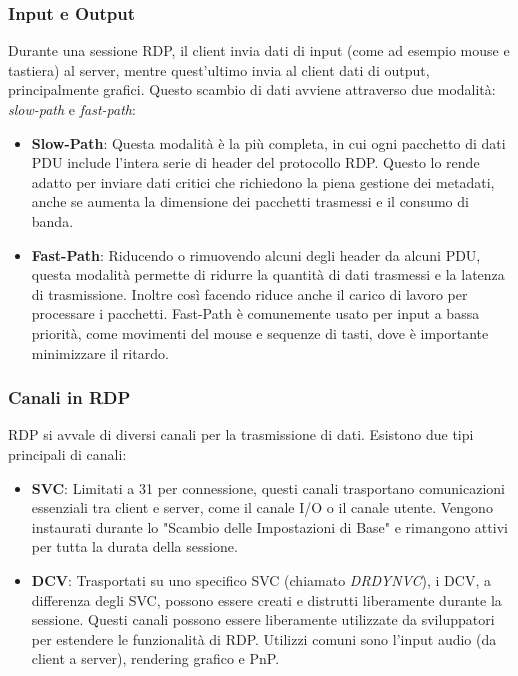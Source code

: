 \documentclass[12pt,a4paper,openright,twoside]{book}
\begin{document}
\subsubsection{Input e Output}
Durante una sessione \ac{RDP}, il client invia dati di input (come ad esempio mouse e tastiera) al server, mentre quest'ultimo invia al client dati di output, principalmente grafici.
Questo scambio di dati avviene attraverso due modalità: \textit{slow-path} e \textit{fast-path}:
\begin{itemize}
    \item \textbf{Slow-Path}: Questa modalità è la più completa, in cui ogni pacchetto di dati \ac{PDU} include l'intera serie di header del protocollo \ac{RDP}.
    Questo lo rende adatto per inviare dati critici che richiedono la piena gestione dei metadati, anche se aumenta la dimensione dei pacchetti trasmessi e il consumo di banda.
    \item \textbf{Fast-Path}: Riducendo o rimuovendo alcuni degli header da alcuni \ac{PDU},
    questa modalità permette di ridurre la quantità di dati trasmessi e la latenza di trasmissione.
    Inoltre così facendo riduce anche il carico di lavoro per processare i pacchetti.
    Fast-Path è comunemente usato per input a bassa priorità, come movimenti del mouse e sequenze di tasti, dove è importante minimizzare il ritardo.
\end{itemize}

\subsubsection{Canali in RDP}
\ac{RDP} si avvale di diversi canali per la trasmissione di dati. Esistono due tipi principali di canali:
\begin{itemize}
    \item \textbf{\ac{SVC}}: Limitati a 31 per connessione,
    questi canali trasportano comunicazioni essenziali tra client e server, come il canale I/O o il canale utente. Vengono instaurati durante lo "Scambio delle Impostazioni di Base" e rimangono attivi per tutta la durata della sessione.
    \item \textbf{\ac{DCV}}: Trasportati su uno specifico \ac{SVC} (chiamato \emph{DRDYNVC}),
    i \ac{DCV}, a differenza degli \ac{SVC},
    possono essere creati e distrutti liberamente durante la sessione.
    Questi canali possono essere liberamente utilizzate da sviluppatori per estendere le funzionalità di \ac{RDP}.
    Utilizzi comuni sono l'input audio (da client a server), rendering grafico e PnP.
\end{itemize}
\end{document}
